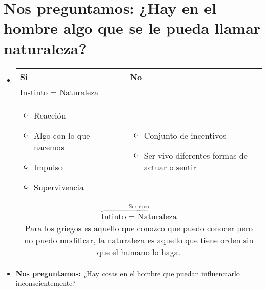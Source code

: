 \section{\textbf{Nos preguntamos:} ¿Hay en el hombre algo que se le pueda llamar naturaleza?}
\begin{itemize}
    \item \begin{center}
       \begin{tabular}{ | p{8cm} | p{8cm} | }
           \hline
               Si & No     \\
           \hline
                \underline{Instinto} = Naturaleza & \\ 
                \begin{itemize}
                    \item Reacción
                    \item Algo con lo que nacemos 
                    \item Impulso 
                    \item Supervivencia 
                \end{itemize} & 
                \begin{itemize}
                    \item Conjunto de incentivos 
                    \item Ser vivo diferentes formas de actuar o sentir
                \end{itemize} \\ 
            \hline
                \multicolumn{2}{c}{$\overbrace{\text{Intinto = Naturaleza}}^{\text{Ser vivo}}$} \\
            \hline
                \multicolumn{2}{c}{Para los griegos es aquello que conozco que puedo conocer pero no puedo modificar, la naturaleza es aquello que tiene orden sin que el humano lo haga. }
       \end{tabular}
    \end{center}
    
    \item \textbf{Nos preguntamos:} ¿Hay cosas en el hombre que puedan influenciarlo inconscientemente?
\end{itemize}



